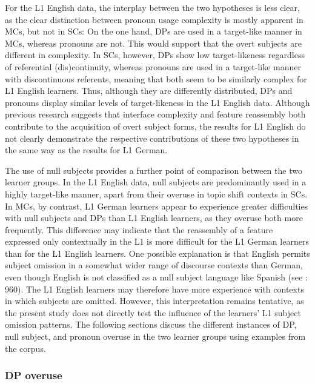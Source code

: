 \documentclass[
  letterpaper,
  DIV=11,
  numbers=noendperiod]{scrartcl}
\begin{document}
For the L1 English data, the interplay between the two hypotheses is
less clear, as the clear distinction between pronoun usage complexity is
mostly apparent in MCs, but not in SCs: On the one hand, DPs are used in
a target-like manner in MCs, whereas pronouns are not. This would
support that the overt subjects are different in complexity. In SCs,
however, DPs show low target-likeness regardless of referential
(dis)continuity, whereas pronouns are used in a target-like manner with
discontinuous referents, meaning that both seem to be similarly complex
for L1 English learners. Thus, although they are differently
distributed, DPs and pronouns display similar levels of target-likeness
in the L1 English data. Although previous research suggests that
interface complexity and feature reassembly both contribute to the
acquisition of overt subject forms, the results for L1 English do not
clearly demonstrate the respective contributions of these two hypotheses
in the same way as the results for L1 German.

The use of null subjects provides a further point of comparison between
the two learner groups. In the L1 English data, null subjects are
predominantly used in a highly target-like manner, apart from their
overuse in topic shift contexts in SCs. In MCs, by contrast, L1 German
learners appear to experience greater difficulties with null subjects
and DPs than L1 English learners, as they overuse both more frequently.
This difference may indicate that the reassembly of a feature expressed
only contextually in the L1 is more difficult for the L1 German learners
than for the L1 English learners. One possible explanation is that
English permits subject omission in a somewhat wider range of discourse
contexts than German, even though English is not classified as a null
subject language like Spanish (see : 960). The L1 English learners may therefore have more
experience with contexts in which subjects are omitted. However, this
interpretation remains tentative, as the present study does not directly
test the influence of the learners' L1 subject omission patterns. The
following sections discuss the different instances of DP, null subject,
and pronoun overuse in the two learner groups using examples from the
corpus.

\subsubsection{DP overuse}\label{dp-overuse}
\end{document}
